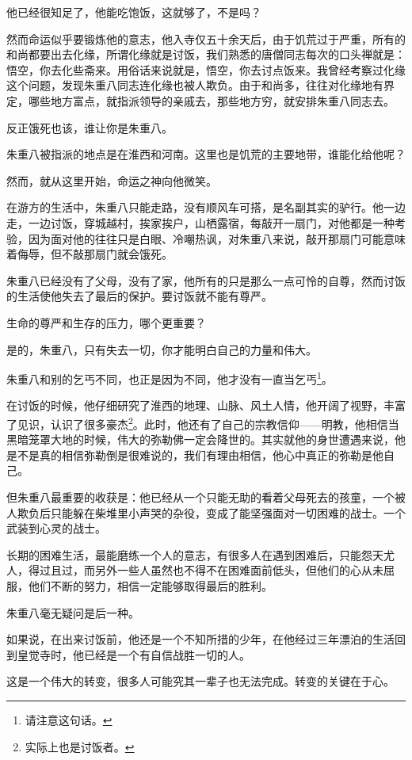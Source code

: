 \begin{multicols}{\theparacolNo}
		他已经很知足了，他能吃饱饭，这就够了，不是吗？

		然而命运似乎要锻炼他的意志，他入寺仅五十余天后，由于饥荒过于严重，所有的和尚都要出去化缘，所谓化缘就是讨饭，我们熟悉的唐僧同志每次的口头禅就是：悟空，你去化些斋来。用俗话来说就是，悟空，你去讨点饭来。我曾经考察过化缘这个问题，发现朱重八同志连化缘也被人欺负。由于和尚多，往往对化缘地有界定，哪些地方富点，就指派领导的亲戚去，那些地方穷，就安排朱重八同志去。

		反正饿死也该，谁让你是朱重八。

		朱重八被指派的地点是在淮西和河南。这里也是饥荒的主要地带，谁能化给他呢？

		然而，就从这里开始，命运之神向他微笑。

		在游方的生活中，朱重八只能走路，没有顺风车可搭，是名副其实的驴行。他一边走，一边讨饭，穿城越村，挨家挨户，山栖露宿，每敲开一扇门，对他都是一种考验，因为面对他的往往只是白眼、冷嘲热讽，对朱重八来说，敲开那扇门可能意味着侮辱，但不敲那扇门就会饿死。

		朱重八已经没有了父母，没有了家，他所有的只是那么一点可怜的自尊，然而讨饭的生活使他失去了最后的保护。要讨饭就不能有尊严。

		生命的尊严和生存的压力，哪个更重要？

		是的，朱重八，只有失去一切，你才能明白自己的力量和伟大。

		朱重八和别的乞丐不同，也正是因为不同，他才没有一直当乞丐\footnote{请注意这句话。}。

		在讨饭的时候，他仔细研究了淮西的地理、山脉、风土人情，他开阔了视野，丰富了见识，认识了很多豪杰\footnote{实际上也是讨饭者。}。此时，他还有了自己的宗教信仰——明教，他相信当黑暗笼罩大地的时候，伟大的弥勒佛一定会降世的。其实就他的身世遭遇来说，他是不是真的相信弥勒倒是很难说的，我们有理由相信，他心中真正的弥勒是他自己。

		但朱重八最重要的收获是：他已经从一个只能无助的看着父母死去的孩童，一个被人欺负后只能躲在柴堆里小声哭的杂役，变成了能坚强面对一切困难的战士。一个武装到心灵的战士。

		长期的困难生活，最能磨练一个人的意志，有很多人在遇到困难后，只能怨天尤人，得过且过，而另外一些人虽然也不得不在困难面前低头，但他们的心从未屈服，他们不断的努力，相信一定能够取得最后的胜利。

		朱重八毫无疑问是后一种。

		如果说，在出来讨饭前，他还是一个不知所措的少年，在他经过三年漂泊的生活回到皇觉寺时，他已经是一个有自信战胜一切的人。

		这是一个伟大的转变，很多人可能究其一辈子也无法完成。转变的关键在于心。


\end{multicols}
